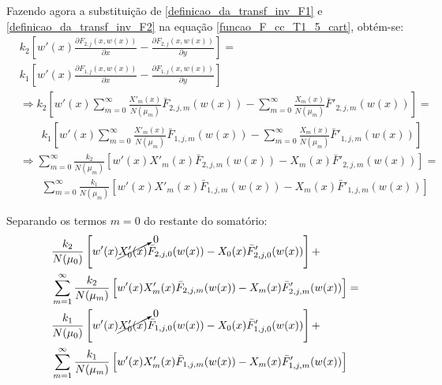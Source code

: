 Fazendo agora a
substituição de \eqref{definicao_da_transf_inv_F1} e
\eqref{definicao_da_transf_inv_F2} na equação \eqref{funcao_F_cc_T1_5_cart}, obtém-se:
\begin{align}
& k_2\left[w'(x)\frac{\partial F_{2,j}(x, w(x))}{\partial x} - \frac{\partial F_{2,j}(x, w(x))}{\partial y}\right] = \nonumber \\
& k_1\left[w'(x)\frac{\partial F_{1,j}(x, w(x))}{\partial x} - \frac{\partial F_{1,j}(x, w(x))}{\partial y}\right] \nonumber \\
& \Rightarrow k_2\left[w'(x)\sum_{m=0}^\infty \frac{X'_m(x)}{N(\mu_m)}\bar{F}_{2,j,m}(w(x)) - \sum_{m=0}^\infty \frac{X_m(x)}{N(\mu_m)}\bar{F}'_{2,j,m}(w(x)) \right] = \nonumber \\
& \quad\quad k_1\left[w'(x)\sum_{m=0}^\infty \frac{X'_m(x)}{N(\mu_m)}\bar{F}_{1,j,m}(w(x)) - \sum_{m=0}^\infty \frac{X_m(x)}{N(\mu_m)}\bar{F}'_{1,j,m}(w(x)) \right] \nonumber \\
& \Rightarrow  \sum_{m=0}^\infty \frac{k_2}{N(\mu_m)} \left[ w'(x) X'_m(x)\bar{F}_{2,j,m}(w(x)) - X_m(x)\bar{F}'_{2,j,m}(w(x)) \right] = \nonumber \\
& \quad\quad \sum_{m=0}^\infty \frac{k_1}{N(\mu_m)} \left[ w'(x) X'_m(x)\bar{F}_{1,j,m}(w(x)) - X_m(x)\bar{F}'_{1,j,m}(w(x)) \right]
\end{align}

Separando os termos $m = 0$ do restante do somatório:
\begin{align}
& \frac{k_2}{N(\mu_0)} \left[ w'(x) \cancelto{0}{X'_0(x)}\bar{F}_{2,j,0}(w(x)) -  X_0(x)\bar{F}'_{2,j,0}(w(x)) \right] + \nonumber \\
& \sum_{m=1}^\infty \frac{k_2}{N(\mu_m)} \left[ w'(x) X'_m(x)\bar{F}_{2,j,m}(w(x)) - X_m(x)\bar{F}'_{2,j,m}(w(x)) \right] = \nonumber \\
& \frac{k_1}{N(\mu_0)} \left[w'(x) \cancelto{0}{X'_0(x)}\bar{F}_{1,j,0}(w(x)) - X_0(x)\bar{F}'_{1,j,0}(w(x)) \right] + \nonumber \\
& \sum_{m=1}^\infty \frac{k_1}{N(\mu_m)} \left[w'(x) X'_m(x)\bar{F}_{1,j,m}(w(x)) - X_m(x)\bar{F}'_{1,j,m}(w(x)) \right]
\end{align}

